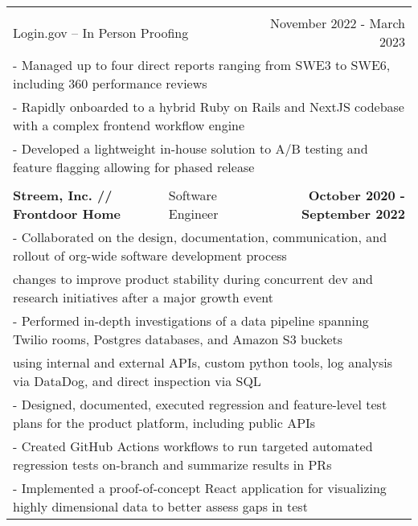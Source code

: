 \documentclass[letterpaper]{article}
\begin{document}
\begin{center}
\begin{tabular}{p{}p{}r}
		  \\
		  \\
			  \multicolumn{2}{p{0.5\textwidth}}{\quad Login.gov -- In Person Proofing}
			  &
			  {November 2022 - March 2023 \quad\quad\quad\quad}
		  \\
			  \multicolumn{3}{p{\textwidth}}{\quad\quad - Managed up to four direct reports ranging from SWE3 to SWE6, including 360 performance reviews} \\
			  \multicolumn{3}{p{\textwidth}}{\quad\quad - Rapidly onboarded to a hybrid Ruby on Rails and NextJS codebase with a complex frontend workflow engine} \\
			  \multicolumn{3}{p{\textwidth}}{\quad\quad - Developed a lightweight in-house solution to A/B testing and feature flagging allowing for phased release}
		  \\
		  \\
				\textbf{Streem, Inc. // Frontdoor Home} &
				\quad\quad\quad\quad\quad\quad Software Engineer &
				\textbf{October 2020 - September 2022\quad}
			\\
				\multicolumn{3}{p{\textwidth}}{\quad\quad - Collaborated on the design, documentation, communication, and rollout of org-wide software development process}
			\\
				\multicolumn{3}{p{\textwidth}}{\quad\quad\quad changes to improve product stability during concurrent dev and research initiatives after a major growth event} 
			\\
				\multicolumn{3}{p{\textwidth}}{\quad\quad - Performed in-depth investigations of a data pipeline spanning Twilio rooms, Postgres databases, and Amazon S3 buckets}  
			\\
				\multicolumn{3}{p{\textwidth}}{\quad\quad\quad using internal and external APIs, custom python tools, log analysis via DataDog, and direct inspection via SQL}
			\\
				\multicolumn{3}{p{\textwidth}}{\quad\quad - Designed, documented, executed regression and feature-level test plans for the product platform, including public APIs} 
			\\
				\multicolumn{3}{p{\textwidth}}{\quad\quad - Created GitHub Actions workflows to run targeted automated regression tests on-branch and summarize results in PRs}
			\\
			    \multicolumn{3}{p{\textwidth}}{\quad\quad - Implemented a proof-of-concept React application for visualizing highly dimensional data to better assess gaps in test}
			\\

\end{tabular}
\end{center}
\end{document}
